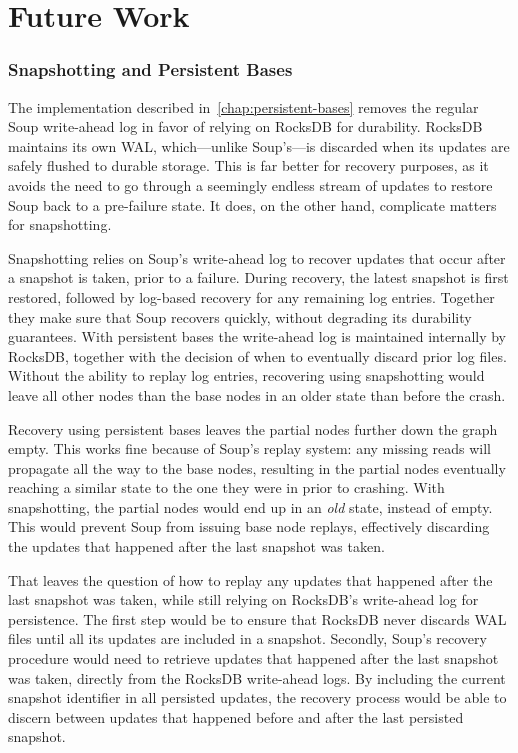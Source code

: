 \chapter{Future Work}\label{chap:future-work}

\subsection{Snapshotting and Persistent Bases}

The  implementation described
in~\ref{chap:persistent-bases} removes the regular Soup write-ahead log in favor
of relying on RocksDB for durability. RocksDB maintains its own WAL,
which---unlike Soup's---is discarded when its updates are safely flushed to
durable storage. This is far better for recovery purposes, as it avoids the need
to go through a seemingly endless stream of updates to restore Soup back to a
pre-failure state. It does, on the other hand, complicate matters for
snapshotting.

Snapshotting relies on Soup's write-ahead log to recover updates that occur
after a snapshot is taken, prior to a failure. During recovery, the latest
snapshot is first restored, followed by log-based recovery for any remaining log
entries. Together they make sure that Soup recovers quickly, without degrading
its durability guarantees. With persistent bases the write-ahead log is
maintained internally by RocksDB, together with the decision of when to
eventually discard prior log files. Without the ability to replay log entries,
recovering using snapshotting would leave all other nodes than the base nodes in
an older state than before the crash.

Recovery using persistent bases leaves the partial nodes further down the graph
empty. This works fine because of Soup's replay system: any missing reads will
propagate all the way to the base nodes, resulting in the partial nodes
eventually reaching a similar state to the one they were in prior to crashing.
With snapshotting, the partial nodes would end up in an \textit{old} state,
instead of empty. This would prevent Soup from issuing base node replays,
effectively discarding the updates that happened after the last snapshot was
taken.

That leaves the question of how to replay any updates that happened after the
last snapshot was taken, while still relying on RocksDB's write-ahead log for
persistence. The first step would be to ensure that RocksDB never discards WAL
files until all its updates are included in a snapshot. Secondly, Soup's
recovery procedure would need to retrieve updates that happened after the last
snapshot was taken, directly from the RocksDB write-ahead logs. By including the
current snapshot identifier in all persisted updates, the recovery process would
be able to discern between updates that happened before and after the last
persisted snapshot.

